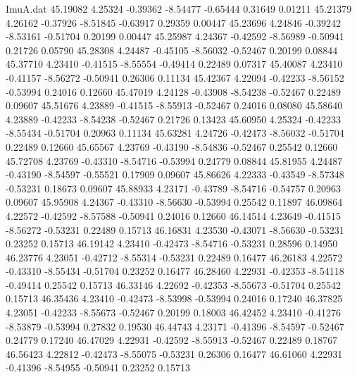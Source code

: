 \begin{filecontents}{ImuA.dat}
  45.19082    4.25324   -0.39362   -8.54477   -0.65444    0.31649    0.01211
  45.21379    4.26162   -0.37926   -8.51845   -0.63917    0.29359    0.00447
  45.23696    4.24846   -0.39242   -8.53161   -0.51704    0.20199    0.00447
  45.25987    4.24367   -0.42592   -8.56989   -0.50941    0.21726    0.05790
  45.28308    4.24487   -0.45105   -8.56032   -0.52467    0.20199    0.08844
  45.37710    4.23410   -0.41515   -8.55554   -0.49414    0.22489    0.07317
  45.40087    4.23410   -0.41157   -8.56272   -0.50941    0.26306    0.11134
  45.42367    4.22094   -0.42233   -8.56152   -0.53994    0.24016    0.12660
  45.47019    4.24128   -0.43908   -8.54238   -0.52467    0.22489    0.09607
  45.51676    4.23889   -0.41515   -8.55913   -0.52467    0.24016    0.08080
  45.58640    4.23889   -0.42233   -8.54238   -0.52467    0.21726    0.13423
  45.60950    4.25324   -0.42233   -8.55434   -0.51704    0.20963    0.11134
  45.63281    4.24726   -0.42473   -8.56032   -0.51704    0.22489    0.12660
  45.65567    4.23769   -0.43190   -8.54836   -0.52467    0.25542    0.12660
  45.72708    4.23769   -0.43310   -8.54716   -0.53994    0.24779    0.08844
  45.81955    4.24487   -0.43190   -8.54597   -0.55521    0.17909    0.09607
  45.86626    4.22333   -0.43549   -8.57348   -0.53231    0.18673    0.09607
  45.88933    4.23171   -0.43789   -8.54716   -0.54757    0.20963    0.09607
  45.95908    4.24367   -0.43310   -8.56630   -0.53994    0.25542    0.11897
  46.09864    4.22572   -0.42592   -8.57588   -0.50941    0.24016    0.12660
  46.14514    4.23649   -0.41515   -8.56272   -0.53231    0.22489    0.15713
  46.16831    4.23530   -0.43071   -8.56630   -0.53231    0.23252    0.15713
  46.19142    4.23410   -0.42473   -8.54716   -0.53231    0.28596    0.14950
  46.23776    4.23051   -0.42712   -8.55314   -0.53231    0.22489    0.16477
  46.26183    4.22572   -0.43310   -8.55434   -0.51704    0.23252    0.16477
  46.28460    4.22931   -0.42353   -8.54118   -0.49414    0.25542    0.15713
  46.33146    4.22692   -0.42353   -8.55673   -0.51704    0.25542    0.15713
  46.35436    4.23410   -0.42473   -8.53998   -0.53994    0.24016    0.17240
  46.37825    4.23051   -0.42233   -8.55673   -0.52467    0.20199    0.18003
  46.42452    4.23410   -0.41276   -8.53879   -0.53994    0.27832    0.19530
  46.44743    4.23171   -0.41396   -8.54597   -0.52467    0.24779    0.17240
  46.47029    4.22931   -0.42592   -8.55913   -0.52467    0.22489    0.18767
  46.56423    4.22812   -0.42473   -8.55075   -0.53231    0.26306    0.16477
  46.61060    4.22931   -0.41396   -8.54955   -0.50941    0.23252    0.15713

\end{filecontents}
